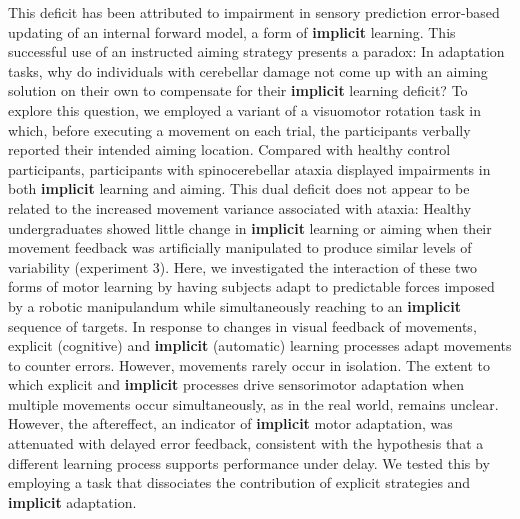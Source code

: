 \documentclass[11pt]{article}
\begin{document}
\newline  [  27  ]   This deficit has been attributed to impairment in sensory  prediction error-based updating of an internal forward model, a form of   \textbf {  implicit  }    learning.
\newline  [  28  ]   This successful use of an  instructed aiming strategy presents a paradox: In adaptation tasks, why do  individuals with cerebellar damage not come up with an aiming solution on their  own to compensate for their   \textbf {  implicit  }   learning deficit? To explore this question,  we employed a variant of a visuomotor rotation task in which, before executing a  movement on each trial, the participants verbally reported their intended aiming  location.
\newline  [  29  ]   Compared with healthy control participants, participants with  spinocerebellar ataxia displayed impairments in both   \textbf {  implicit  }   learning and  aiming.
\newline  [  30  ]   This dual deficit does not appear to  be related to the increased movement variance associated with ataxia: Healthy  undergraduates showed little change in   \textbf {  implicit  }   learning or aiming when their  movement feedback was artificially manipulated to produce similar levels of  variability (experiment 3).
\newline  [  31  ]   Here, we investigated the interaction  of these two forms of motor learning by having subjects adapt to predictable  forces imposed by a robotic manipulandum while simultaneously reaching to an    \textbf {  implicit  }   sequence of targets.
\newline  [  32  ]   In  response to changes in visual feedback of movements, explicit (cognitive) and    \textbf {  implicit  }   (automatic) learning processes adapt movements to counter errors.  However, movements rarely occur in isolation.
\newline  [  33  ]   The extent to which explicit and    \textbf {  implicit  }   processes drive sensorimotor adaptation when multiple movements occur  simultaneously, as in the real world, remains unclear.
\newline  [  34  ]   However, the aftereffect, an indicator of    \textbf {  implicit  }   motor adaptation, was attenuated with delayed error feedback,  consistent with the hypothesis that a different learning process supports  performance under delay.
\newline  [  35  ]   We tested this by employing a task that dissociates the  contribution of explicit strategies and   \textbf {  implicit  }   adaptation.
\end{document}

